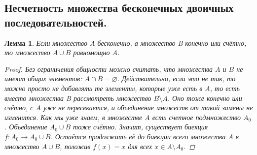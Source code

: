 \documentclass{article}
\newtheorem{lemma}{Лемма}
\begin{document}
\subsection{Несчетность множества бесконечных двоичных последовательностей.}
\begin{lemma}
Если множество $A$ бесконечно, а множество B конечно или счётно, то множество $A \cup B$ равномощно $A$.
\begin{proof}
Без ограничения общности можно считать, что множества $A$ и $B$ не имеют общих элементов: $A \cap B = \varnothing$. Действительно, если это не так, то можно просто не добавлять те элементы, которые уже есть в $A$, то есть вместо множества B рассмотреть множество $B \setminus A$. Оно тоже конечно или счётно, с $A$ уже не пересекается, а объединение множеств от такой замены не изменится.
\newline
Как мы уже знаем, в множестве $A$ есть счетное подмножество $A_0$. Объединение $A_0 \cup B$ тоже счётно. Значит, существует биекция $f : A_0 \to A_0 \cup B$. Остаётся продолжить её до биекции всего множества $A$ в множество $A \cup B$, положив $f(x) = x$ для всех $x \in A \setminus A_0$.
\end{proof}
\end{lemma}
\end{document}
